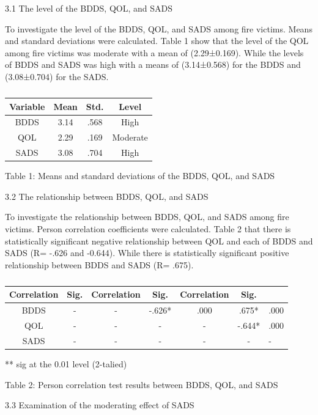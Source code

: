 \documentclass[10pt]{NSP1}
\begin{document}
3.1 The level of the BDDS, QOL, and SADS

To investigate the level of the BDDS, QOL, and SADS among fire victims. Means and standard deviations were calculated. Table 1 show that the level of the QOL among fire victims was moderate with a mean of (2.29±0.169). While the levels of BDDS and SADS was high with a means of (3.14±0.568) for the BDDS and (3.08±0.704) for the SADS.

\begin{table}[htbp]
\centering
\begin{tabular}{cccc}
\hline
Variable & Mean & Std. & Level \\
\hline
BDDS & 3.14 & .568 & High \\
QOL & 2.29 & .169 & Moderate \\
SADS & 3.08 & .704 & High \\
\hline
\end{tabular}
\caption{}

\end{table}

Table 1: Means and standard deviations of the BDDS, QOL, and SADS

3.2 The relationship between BDDS, QOL, and SADS

To investigate the relationship between BDDS, QOL, and SADS among fire victims. Person correlation coefficients were calculated. Table 2 that there is statistically significant negative relationship between QOL and each of BDDS and SADS (R= -.626 and -0.644). While there is statistically significant positive relationship between BDDS and SADS (R= .675).

\begin{table}[htbp]
\centering
\begin{tabular}{cccccc}
\hline
Correlation & Sig. & Correlation & Sig. & Correlation & Sig. \\
\hline
BDDS & - & - & -.626* & .000 & .675* & .000 \\
QOL & - & - & - & - & -.644* & .000 \\
SADS & - & - & - & - & - & - \\
\hline
\end{tabular}
\caption{}

\end{table}

** sig at the 0.01 level (2-talied)

Table 2: Person correlation test results between BDDS, QOL, and SADS

3.3 Examination of the moderating effect of SADS
\end{document}
